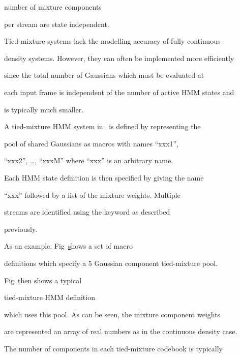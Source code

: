 number of mixture components


per stream are state independent.








Tied-mixture systems lack the modelling accuracy of fully continuous


density systems.  However, they can often be implemented more efficiently


since the total number of Gaussians which must be evaluated at


each input frame is independent of the number of active HMM states and


is typically much smaller.








A tied-mixture HMM system in \HTK\ is defined by representing the


pool of shared Gaussians as  macros with names ``xxx1'',


``xxx2'', \ldots, ``xxxM'' where ``xxx'' is an arbitrary name.


Each HMM state definition is then specified by giving the name


``xxx'' followed by a list of the mixture weights.  Multiple


streams are identified using the  keyword as described


previously.





As an example, Fig~\href{f:tmixpool} shows a set of macro


definitions which specify a 5 Gaussian component tied-mixture pool.








Fig~\href{f:tmixhmm} then shows a typical 


tied-mixture HMM definition


which uses this pool.  As can be seen, the mixture component weights


are represented an array of real numbers as in the continuous density case.





The number of components in each tied-mixture codebook is typically


